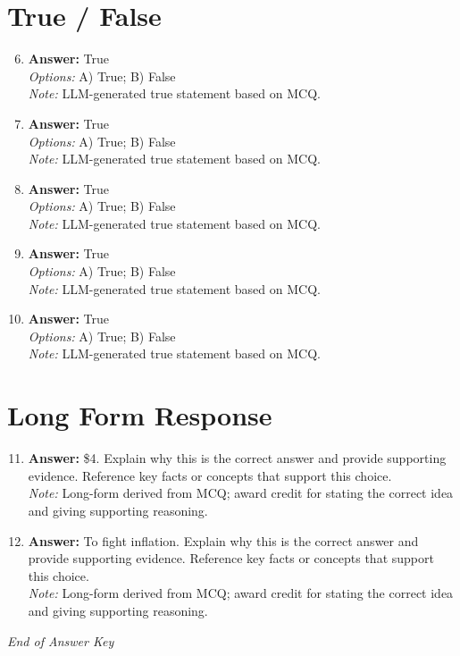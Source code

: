 \documentclass[12pt]{article}
\begin{document}
\section*{True / False}
\begin{enumerate}[label=\arabic*.]
\setcounter{enumi}{5}
\item \textbf{Answer:} True
\\ \textit{Options:} A) True; B) False
\\ \textit{Note:} LLM-generated true statement based on MCQ.
\item \textbf{Answer:} True
\\ \textit{Options:} A) True; B) False
\\ \textit{Note:} LLM-generated true statement based on MCQ.
\item \textbf{Answer:} True
\\ \textit{Options:} A) True; B) False
\\ \textit{Note:} LLM-generated true statement based on MCQ.
\item \textbf{Answer:} True
\\ \textit{Options:} A) True; B) False
\\ \textit{Note:} LLM-generated true statement based on MCQ.
\item \textbf{Answer:} True
\\ \textit{Options:} A) True; B) False
\\ \textit{Note:} LLM-generated true statement based on MCQ.
\end{enumerate}

\section*{Long Form Response}
\begin{enumerate}[label=\arabic*.]
\setcounter{enumi}{10}
\item \textbf{Answer:} \$4. Explain why this is the correct answer and provide supporting evidence. Reference key facts or concepts that support this choice.
\\ \textit{Note:} Long-form derived from MCQ; award credit for stating the correct idea and giving supporting reasoning.
\item \textbf{Answer:} To fight inflation. Explain why this is the correct answer and provide supporting evidence. Reference key facts or concepts that support this choice.
\\ \textit{Note:} Long-form derived from MCQ; award credit for stating the correct idea and giving supporting reasoning.
\end{enumerate}

\vfill
\noindent\textit{End of Answer Key}
\end{document}
